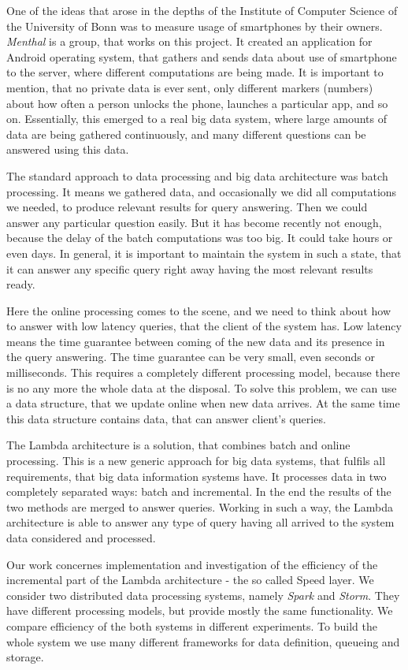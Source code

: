 One of the ideas that arose in the depths of the Institute of Computer Science of the University of Bonn was to measure usage of smartphones by their owners.
\textit{Menthal} is a group, that works on this project.
It created an application for Android operating system, that gathers and sends data about use of smartphone to the server, where different computations are being made.
It is important to mention, that no private data is ever sent, only different markers (numbers) about how often a person unlocks the phone, launches a particular app, and so on.
Essentially, this emerged to a real big data system, where large amounts of data are being gathered continuously, and many different questions can be answered using this data.

The standard approach to data processing and big data architecture was batch processing.
It means we gathered data, and occasionally we did all computations we needed, to produce relevant results for query answering.
Then we could answer any particular question easily.
But it has become recently not enough, because the delay of the batch computations was too big.
It could take hours or even days.
In general, it is important to maintain the system in such a state, that it can answer any specific query right away having the most relevant results ready.

Here the online processing comes to the scene, and we need to think about how to answer with low latency queries, that the client of the system has.
Low latency means the time guarantee between coming of the new data and its presence in the query answering.
The time guarantee can be very small, even seconds or milliseconds.
This requires a completely different processing model, because there is no any more the whole data at the disposal.
To solve this problem, we can use a data structure, that we update online when new data arrives.
At the same time this data structure contains data, that can answer client's queries.

The Lambda architecture is a solution, that combines batch and online processing.
This is a new generic approach for big data systems, that fulfils all requirements, that big data information systems have.
It processes data in two completely separated ways: batch and incremental.
In the end the results of the two methods are merged to answer queries.
Working in such a way, the Lambda architecture is able to answer any type of query having all arrived to the system data considered and processed.

Our work concernes implementation and investigation of the efficiency of the incremental part of the Lambda architecture - the so called Speed layer.
We consider two distributed data processing systems, namely \textit{Spark} and \textit{Storm}.
They have different processing models, but provide mostly the same functionality.
We compare efficiency of the both systems in different experiments.
To build the whole system we use many different frameworks for data definition, queueing and storage.

